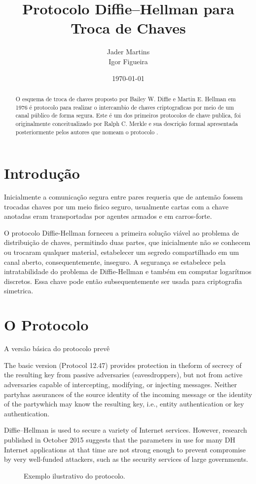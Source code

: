 \documentclass{article}
\title{Protocolo Diffie–Hellman para Troca de Chaves}
\author{Jader Martins\\
        Igor Figueira}
\date{\today}
\begin{document}
\maketitle

\begin{abstract}
    O esquema de troca de chaves proposto por Bailey W. Diffie e
    Martin E. Hellman em 1976 é protocolo para realizar
    o intercambio de chaves criptograficas por meio de um canal público
    de forma segura\cite{Diffie}. Este é um dos primeiros protocolos de
    chave publica, foi originalmente conceitualizado por Ralph C. Merkle
    e sua descrição formal apresentada posteriormente pelos autores que
    nomeam o protocolo \cite{Merkle}.
\end{abstract}

\section{Introdução}%
\label{sec:introducao}
Inicialmente a comunicação segura entre pares requeria que de antemão fossem
trocadas chaves por um meio fisico seguro, usualmente cartas com a chave
anotadas eram transportadas por agentes armados e em carros-forte.

O protocolo Diffie-Hellman forneceu a primeira solução viável ao problema
de distribuição de chaves, permitindo duas partes, que inicialmente não se
conhecem ou trocaram qualquer material, estabelecer um segredo compartilhado
em um canal aberto, consequentemente, inseguro. A segurança se estabelece
pela intratabilidade do problema de Diffie-Hellman e também em computar
logarítmos discretos\cite{katz1996handbook}. Essa chave pode então
subsequentemente ser usada para criptografia simetrica.


\section{O Protocolo}%
\label{sec:o_protocolo}



A versão básica do protocolo prevê

The basic version (Protocol 12.47) provides protection in theform of secrecy of the resulting key from passive adversaries (eavesdroppers), but not from active adversaries capable of intercepting, modifying, or injecting messages. Neither partyhas assurances of the source identity of the incoming message or the identity of the partywhich may know the resulting key, i.e., entity authentication or key authentication.

Diffie–Hellman is used to secure a variety of Internet services. However, research published in October 2015 suggests that the parameters in use for many DH Internet applications at that time are not strong enough to prevent compromise by very well-funded attackers, such as the security services of large governments.

\begin{figure}[htpb]
    \centering
    
    \caption{Exemplo ilustrativo do protocolo.}%
    \label{fig:diagram}
\end{figure}



\end{document}
